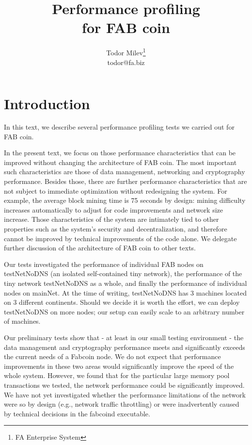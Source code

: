 \documentclass{article}
\title{
Performance profiling \\
for FAB coin
}
\author{Todor Milev\footnote{FA Enterprise System}\\ todor@fa.biz}
\begin{document}
\maketitle
\section{Introduction}
In this text, we describe several performance profiling tests we carried out for FAB coin. 

In the present text, we focus on those performance characteristics that can be improved without changing the architecture of FAB coin.
The most important such characteristics are those of data management, networking and cryptography performance. Besides those, there are further performance characteristics that are not subject to immediate optimization without redesigning the system. For example, the average block mining time is 75 seconds by design: mining difficulty increases automatically to adjust for code improvements and network size increase. Those characteristics of the system are intimately tied to other properties such as the system's security and decentralization, and therefore cannot be improved by technical improvements of the code alone. We delegate further discussion of the architecture of FAB coin to other texts.


Our tests investigated the performance of individual FAB nodes on testNetNoDNS (an isolated self-contained tiny network), the performance of the tiny network testNetNoDNS as a whole, and finally the performance of individual nodes on mainNet. At the time of writing, testNetNoDNS has $3$ machines located on $3$ different continents. Should we decide it is worth the effort, we can deploy testNetNoDNS on more nodes; our setup can easily scale to an arbitrary number of machines.

Our preliminary tests show that - at least in our small testing environment - the data management and cryptography performance meets and significantly exceeds the current needs of a Fabcoin node. We do not expect that performance improvements in these two areas would significantly improve the speed of the whole system. However, we found that for the particular large memory pool transactions we tested, the network performance could be significantly improved. We have not yet investigated whether the performance limitations of the network were so by design (e.g., network traffic throttling) or were inadvertently caused by technical decisions in the fabcoind executable.
\end{document}
